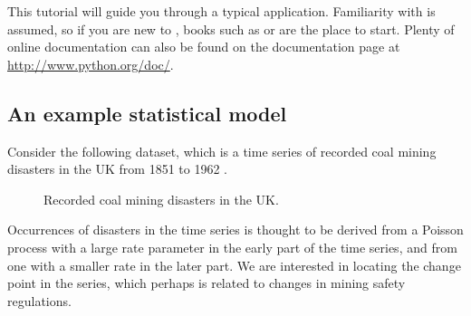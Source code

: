 \documentclass[]{jss}
\begin{document}
This tutorial will guide you through a typical  application.
Familiarity with  is assumed, so if you are new to , books such as
\citet{Lutz:2007} or \citet{Langtangen:2009} are the place to start. Plenty of
online documentation can also be found on the  documentation page at  
\href{http://www.python.org/doc/}{http://www.python.org/doc/}.

\subsection{An example statistical model}
Consider the following dataset, which is a time series of recorded coal mining
disasters in the UK from 1851 to 1962 \citep{Jarrett:1979fr}.
\begin{figure}[h!]
\begin{center}
\caption{Recorded coal mining disasters in the UK. }
\end{center}
\end{figure}
Occurrences of disasters in the time series is thought to be derived from a Poisson process with a large rate parameter in the early part of the time series, and from one with a smaller rate in the later part. We are interested in locating the change point in the series, which perhaps is related to changes in mining safety regulations.
\end{document}
